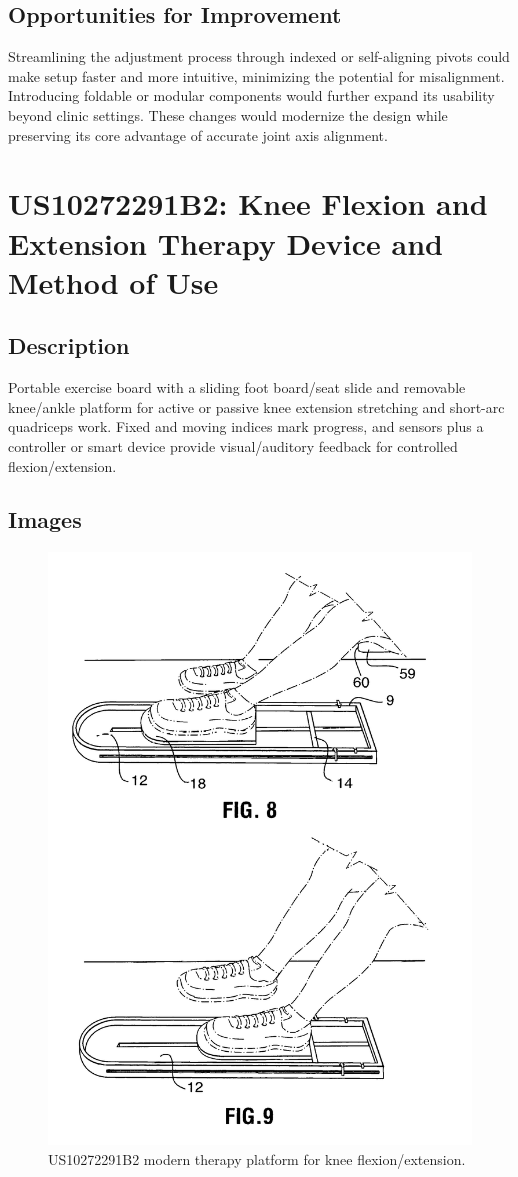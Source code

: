 \documentclass[11pt]{article}
\begin{document}
\subsection{Opportunities for Improvement}
Streamlining the adjustment process through indexed or self-aligning pivots could make setup faster and more intuitive, minimizing the potential for misalignment. Introducing foldable or modular components would further expand its usability beyond clinic settings. These changes would modernize the design while preserving its core advantage of accurate joint axis alignment.

\section{US10272291B2: Knee Flexion and Extension Therapy Device and Method of Use}
\subsection{Description}
Portable exercise board with a sliding foot board/seat slide and removable knee/ankle platform for active or passive knee extension stretching and short-arc quadriceps work. Fixed and moving indices mark progress, and sensors plus a controller or smart device provide visual/auditory feedback for controlled flexion/extension.
\subsection{Images}
\begin{figure}[H]
  \centering
  \includegraphics[width=0.54\linewidth]{10272291B2_1.png}
  \caption{US10272291B2 modern therapy platform for knee flexion/extension.}
  \label{fig:US10272291B2}
\end{figure}
\end{document}
